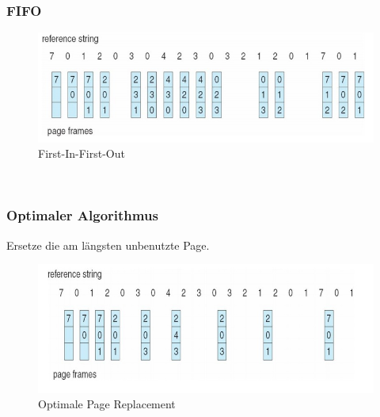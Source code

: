 \documentclass[a4paper]{scrreprt}
\begin{document}
\subsubsection{FIFO}

\begin{figure}[ht]
\centering
\includegraphics[scale=0.5]{graphics/FIFO.png}
\caption{First-In-First-Out}
\end{figure}
\ \\

\subsubsection{Optimaler Algorithmus}
Ersetze die am längsten unbenutzte Page.
\ \\
\begin{figure}[ht]
\centering
\includegraphics[scale=0.5]{graphics/optimalpagereplacement.png}
\caption{Optimale Page Replacement}
\end{figure}
\ \\ 
\end{document}
